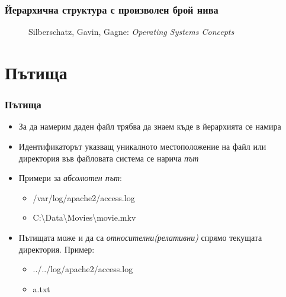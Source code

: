 \documentclass[ignorenonframetext, hyperref=unicode]{beamer}
\begin{document}
\begin{frame}
\frametitle{Йерархична структура с произволен брой нива}
\begin{figure}[h]
\center
{}
\caption{Silberschatz, Gavin, Gagne: {\em Operating Systems Concepts}}
\end{figure}
\end{frame}

\section{Пътища}

\begin{frame}
\frametitle{Пътища}
\begin{itemize}
  \item За да намерим даден файл трябва да знаем къде в йерархията се намира
  \item Идентификаторът указващ уникалното местоположение на файл или директория във файловата система се нарича {\em път}
  \item Примери за {\em абсолютен път}:
  \begin{itemize}
    \item /var/log/apache2/access.log
    \item C:\textbackslash Data\textbackslash  Movies\textbackslash movie.mkv
  \end{itemize}
  \item Пътищата може и да са {\em относителни(релативни)} спрямо текущата директория. Пример:
  \begin{itemize}
    \item ../../log/apache2/access.log
    \item a.txt
  \end{itemize}
\end{itemize}
\end{frame}
\end{document}
